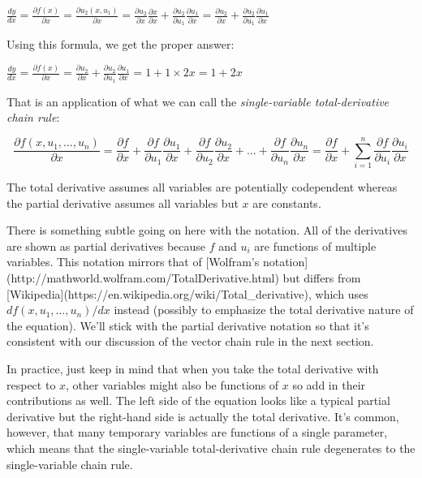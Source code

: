 \documentclass[11pt]{article}
\begin{document}
$\frac{dy}{dx} = \frac{\partial f(x)}{\partial x} = \frac{\partial u_2(x,u_1)}{\partial x} = \frac{\partial u_2}{\partial x}\frac{\partial x}{\partial x} + \frac{\partial u_2}{\partial u_1}\frac{\partial u_1}{\partial x} = \frac{\partial u_2}{\partial x} + \frac{\partial u_2}{\partial u_1}\frac{\partial u_1}{\partial x}$

Using this formula, we get the proper answer:

$\frac{dy}{dx} = \frac{\partial f(x)}{\partial x} = \frac{\partial u_2}{\partial x} + \frac{\partial u_2}{\partial u_1}\frac{\partial  u_1}{\partial  x} = 1 + 1 \times 2x = 1 + 2x$

That is an application of what we can call the {\em single-variable total-derivative chain rule}:

\[
\frac{\partial f(x,u_1,\ldots,u_n)}{\partial x} = \frac{\partial f}{\partial x} + \frac{\partial f}{\partial u_1}\frac{\partial  u_1}{\partial  x} + \frac{\partial f}{\partial u_2}\frac{\partial  u_2}{\partial  x} + \ldots + \frac{\partial f}{\partial u_n}\frac{\partial  u_n}{\partial x} = \frac{\partial f}{\partial x} + \sum_{i=1}^n \frac{\partial f}{\partial u_i}\frac{\partial  u_i}{\partial  x}
\]

The total derivative assumes all variables are potentially codependent whereas the partial derivative assumes all variables but $x$ are constants.

There is something subtle going on here with the notation. All of the derivatives are shown as partial derivatives because $f$ and $u_i$ are functions of multiple variables. This notation mirrors that of [Wolfram's notation](http://mathworld.wolfram.com/TotalDerivative.html) but differs from  [Wikipedia](https://en.wikipedia.org/wiki/Total\_derivative), which uses ${d f(x,u_1,\ldots,u_n)}/{d x}$ instead (possibly to emphasize the total derivative nature of the equation). We'll stick with the partial derivative notation so that it's consistent with our discussion of the vector chain rule in the next section.

In practice, just keep in mind that when you take the total derivative with respect to $x$, other variables might also be functions of $x$ so add in their contributions as well.  The left side of the equation looks like a typical partial derivative but the right-hand side is actually the total derivative.  It's common, however, that many temporary variables are functions of a single parameter, which means that the single-variable total-derivative chain rule degenerates to the single-variable chain rule.
\end{document}
